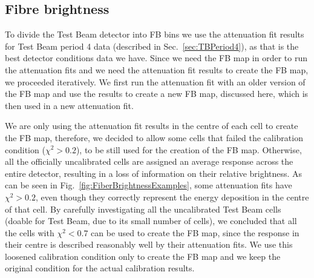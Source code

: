 
\subsection{Fibre brightness}\label{sec:FibreBrightnessTB}

To divide the Test Beam detector into \gls{FB} bins we use the attenuation fit results for Test Beam period 4 data (described in Sec.~\ref{sec:TBPeriod4}), as that is the best detector conditions data we have. Since we need the \gls{FB} map in order to run the attenuation fits and we need the attenuation fit results to create the \gls{FB} map, we proceeded iteratively. We first run the attenuation fit with an older version of the \gls{FB} map and use the results to create a new \gls{FB} map, discussed here, which is then used in a new attenuation fit.

We are only using the attenuation fit results in the centre of each cell to create the \gls{FB} map, therefore, we decided to allow some cells that failed the calibration condition ($\chi^2>0.2$), to be still used for the creation of the \gls{FB} map. Otherwise, all the officially uncalibrated cells are assigned an average response across the entire detector, resulting in a loss of information on their relative brightness. As can be seen in Fig.~\ref{fig:FiberBrightnessExamples}, some attenuation fits have $\chi^2>0.2$, even though they correctly represent the energy deposition in the centre of that cell. By carefully investigating all the uncalibrated Test Beam cells (doable for Test Beam, due to its small number of cells), we concluded that all the cells with $\chi^2<0.7$ can be used to create the \gls{FB} map, since the response in their centre is described reasonably well by their attenuation fits. We use this loosened calibration condition only to create the \gls{FB} map and we keep the original condition for the actual calibration results.


